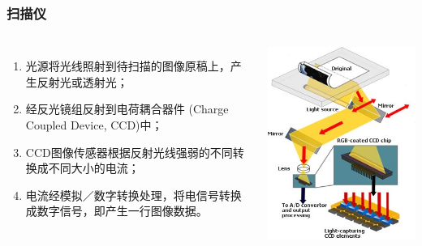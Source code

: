 \documentclass{beamer}
\begin{document}
\begin{frame}
	\frametitle{扫描仪}
	\beamertemplatetransparentcovereddynamicmedium
	\begin{columns}
	\begin{enumerate}[<+->]
		\item {\small 光源将光线照射到待扫描的图像原稿上，产生反射光或透射光；}
		\item {\small 经反光镜组反射到电荷耦合器件 (Charge Coupled Device, CCD)中；}
		\item {\small CCD图像传感器根据反射光线强弱的不同转换成不同大小的电流；}
		\item {\small 电流经模拟／数字转换处理，将电信号转换成数字信号，即产生一行图像数据。}
	\end{enumerate}
	\includegraphics[width=.9\textwidth]{images/scanner-diagram.jpg}
	\end{columns}
\end{frame}
\end{document}
